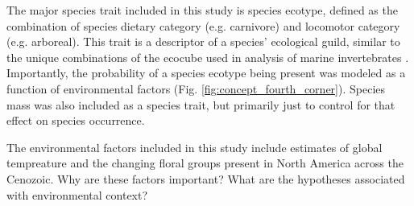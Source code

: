 \documentclass[12pt,letterpaper]{article}
\begin{document}
The major species trait included in this study is species ecotype, defined as the combination of species dietary category (e.g. carnivore) and locomotor category (e.g. arboreal). This trait is a descriptor of a species' ecological guild, similar to the unique combinations of the ecocube used in analysis of marine invertebrates \citep{Bush2007,Bambach2007,Bush2011}. Importantly, the probability of a species ecotype being present was modeled as a function of environmental factors (Fig. \ref{fig:concept_fourth_corner}). Species mass was also included as a species trait, but primarily just to control for that effect on species occurrence. 


The environmental factors included in this study include estimates of global tempreature and the changing floral groups present in North America across the Cenozoic. Why are these factors important? What are the hypotheses associated with environmental context?








\end{document}
